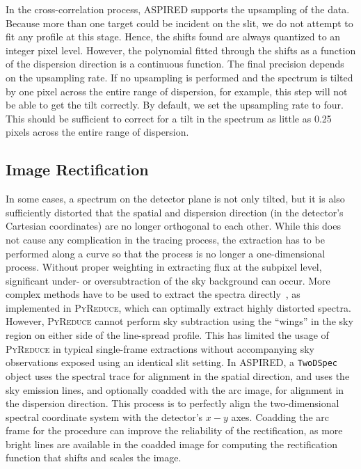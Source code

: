 \documentclass[linenumbers, twocolumn]{aastex631}
\begin{document}
In the cross-correlation process, ASPIRED supports the upsampling of the data. 
Because more than one target could be incident on the slit, we do not attempt
to fit any profile at this stage. Hence, the shifts found are always
quantized to an integer pixel level. However, the polynomial fitted through
the shifts as a function of the dispersion direction is a continuous function.
The final precision depends on the upsampling rate. If no upsampling is
performed and the spectrum is tilted by one pixel across the entire range of
dispersion, for example, this step will not be able to get the tilt correctly.
By default, we set the upsampling rate to four. This should be sufficient to
correct for a tilt in the spectrum as little as 0.25 pixels across the entire
range of dispersion.

\subsection{Image Rectification}
In some cases, a spectrum on the detector plane is not only tilted, but it is
also sufficiently distorted that the spatial and dispersion direction (in the
detector's Cartesian coordinates) are no longer orthogonal to each other. While
this does not cause any complication in the tracing process, the extraction has
to be performed along a curve so that the process is no longer a one-dimensional
process. Without proper weighting in extracting flux at the subpixel level,
significant under- or oversubtraction of the sky background can occur. More
complex methods have to be used to extract the spectra
directly~\citep[e.g.][]{2021A&A...646A..32P}, as implemented in
\textsc{PyReduce}, which can optimally extract highly distorted spectra.
However, \textsc{PyReduce} cannot perform sky subtraction using the ``wings''
in the sky region on either side of the line-spread profile. This has limited
the usage of \textsc{PyReduce} in typical single-frame extractions without
accompanying sky observations exposed using an identical slit setting. In
\textsc{ASPIRED}, a \texttt{TwoDSpec} object uses the spectral trace for
alignment in the spatial direction, and uses the sky emission lines, and
optionally coadded with the arc image, for alignment in the dispersion
direction. This process is to perfectly align the two-dimensional spectral coordinate system
with the detector's $x-y$ axes. Coadding the arc frame for the procedure can
improve the reliability of the rectification, as more bright lines are available
in the coadded image for computing the rectification function that shifts and
scales the image.
\end{document}
